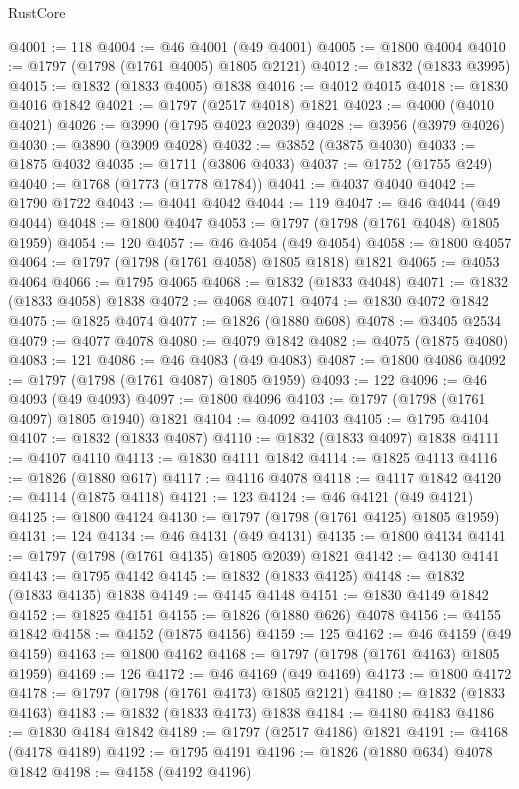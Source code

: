 \begin{lexlean}{RustCore}
\begin{coremodule}
@4001 := 118
@4004 := @46 @4001 (@49 @4001)
@4005 := @1800 @4004
@4010 := @1797 (@1798 (@1761 @4005) @1805 @2121)
@4012 := @1832 (@1833 @3995)
@4015 := @1832 (@1833 @4005) @1838
@4016 := @4012 @4015
@4018 := @1830 @4016 @1842
@4021 := @1797 (@2517 @4018) @1821
@4023 := @4000 (@4010 @4021)
@4026 := @3990 (@1795 @4023 @2039)
@4028 := @3956 (@3979 @4026)
@4030 := @3890 (@3909 @4028)
@4032 := @3852 (@3875 @4030)
@4033 := @1875 @4032
@4035 := @1711 (@3806 @4033)
@4037 := @1752 (@1755 @249)
@4040 := @1768 (@1773 (@1778 @1784))
@4041 := @4037 @4040
@4042 := @1790 @1722
@4043 := @4041 @4042
@4044 := 119
@4047 := @46 @4044 (@49 @4044)
@4048 := @1800 @4047
@4053 := @1797 (@1798 (@1761 @4048) @1805 @1959)
@4054 := 120
@4057 := @46 @4054 (@49 @4054)
@4058 := @1800 @4057
@4064 := @1797 (@1798 (@1761 @4058) @1805 @1818) @1821
@4065 := @4053 @4064
@4066 := @1795 @4065
@4068 := @1832 (@1833 @4048)
@4071 := @1832 (@1833 @4058) @1838
@4072 := @4068 @4071
@4074 := @1830 @4072 @1842
@4075 := @1825 @4074
@4077 := @1826 (@1880 @608)
@4078 := @3405 @2534
@4079 := @4077 @4078
@4080 := @4079 @1842
@4082 := @4075 (@1875 @4080)
@4083 := 121
@4086 := @46 @4083 (@49 @4083)
@4087 := @1800 @4086
@4092 := @1797 (@1798 (@1761 @4087) @1805 @1959)
@4093 := 122
@4096 := @46 @4093 (@49 @4093)
@4097 := @1800 @4096
@4103 := @1797 (@1798 (@1761 @4097) @1805 @1940) @1821
@4104 := @4092 @4103
@4105 := @1795 @4104
@4107 := @1832 (@1833 @4087)
@4110 := @1832 (@1833 @4097) @1838
@4111 := @4107 @4110
@4113 := @1830 @4111 @1842
@4114 := @1825 @4113
@4116 := @1826 (@1880 @617)
@4117 := @4116 @4078
@4118 := @4117 @1842
@4120 := @4114 (@1875 @4118)
@4121 := 123
@4124 := @46 @4121 (@49 @4121)
@4125 := @1800 @4124
@4130 := @1797 (@1798 (@1761 @4125) @1805 @1959)
@4131 := 124
@4134 := @46 @4131 (@49 @4131)
@4135 := @1800 @4134
@4141 := @1797 (@1798 (@1761 @4135) @1805 @2039) @1821
@4142 := @4130 @4141
@4143 := @1795 @4142
@4145 := @1832 (@1833 @4125)
@4148 := @1832 (@1833 @4135) @1838
@4149 := @4145 @4148
@4151 := @1830 @4149 @1842
@4152 := @1825 @4151
@4155 := @1826 (@1880 @626) @4078
@4156 := @4155 @1842
@4158 := @4152 (@1875 @4156)
@4159 := 125
@4162 := @46 @4159 (@49 @4159)
@4163 := @1800 @4162
@4168 := @1797 (@1798 (@1761 @4163) @1805 @1959)
@4169 := 126
@4172 := @46 @4169 (@49 @4169)
@4173 := @1800 @4172
@4178 := @1797 (@1798 (@1761 @4173) @1805 @2121)
@4180 := @1832 (@1833 @4163)
@4183 := @1832 (@1833 @4173) @1838
@4184 := @4180 @4183
@4186 := @1830 @4184 @1842
@4189 := @1797 (@2517 @4186) @1821
@4191 := @4168 (@4178 @4189)
@4192 := @1795 @4191
@4196 := @1826 (@1880 @634) @4078 @1842
@4198 := @4158 (@4192 @4196)

\end{coremodule}
\end{lexlean}
